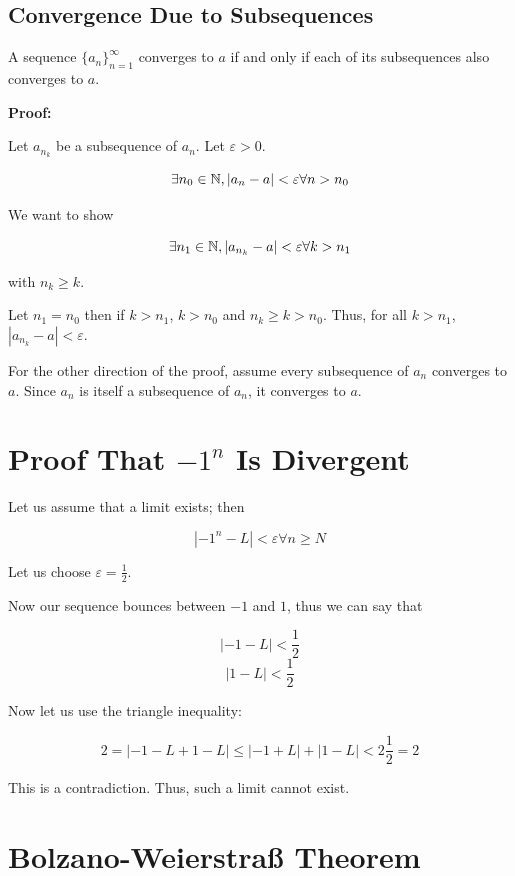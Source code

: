 \QED

\subsection{Convergence Due to Subsequences}

A sequence \(\{a_n\}_{n = 1}^{\infty}\) converges to \(a\) if and only if each of its subsequences also
converges to \(a\).

\textbf{Proof:}

Let \(a_{n_k}\) be a subsequence of \(a_n\). Let \(\varepsilon > 0\).

\[
	\exists n_0 \in \mathbb{N}, |a_n - a| < \varepsilon \forall n > n_0
\]

We want to show

\[
	\exists n_1 \in \mathbb{N}, |a_{n_k} - a| < \varepsilon \forall k > n_1
\]

with \(n_k \ge k\).

Let \(n_1 = n_0\) then if \(k > n_1\), \(k > n_0\) and \(n_k \ge k > n_0\). Thus, for all \(k > n_1\),
\(|a_{n_k} - a | < \varepsilon\).

For the other direction of the proof, assume every subsequence of \(a_n\) converges to \(a\). Since \(a_n\) is itself a subsequence
of \(a_n\), it converges to \(a\).

\QED

\section{\texorpdfstring{Proof That \(-1^n\) Is Divergent}{}}

Let us assume that a limit exists; then

\[
	|-1^n - L| < \varepsilon \forall n \ge N
\]

Let us choose \(\varepsilon = \frac{1}{2}\).

Now our sequence bounces between \(-1\) and \(1\), thus we can say that

\[
	|-1 - L| < \frac{1}{2}
\]
\[
	|1 - L| < \frac{1}{2}
\]

Now let us use the triangle inequality:

\[
	2 = |-1 - L + 1 - L| \le |-1 + L| +  |1 - L| < 2\frac{1}{2} = 2
\]

This is a contradiction. Thus, such a limit cannot exist.

\QED

\section{Bolzano-Weierstraß Theorem}


